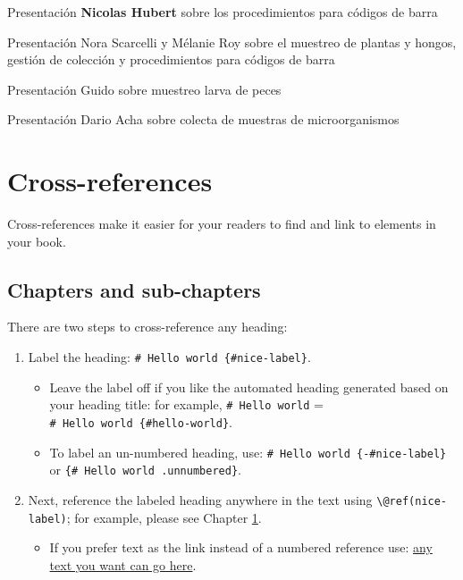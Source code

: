 \documentclass[
]{book}
\providecommand{\tightlist}{%
  \setlength{\itemsep}{0pt}\setlength{\parskip}{0pt}}
\begin{document}
Presentación \textbf{Nicolas Hubert} sobre los procedimientos para códigos de barra

Presentación Nora Scarcelli y Mélanie Roy sobre el muestreo de plantas y
hongos, gestión de colección y procedimientos para códigos de barra

Presentación Guido sobre muestreo larva de peces

Presentación Dario Acha sobre colecta de muestras de microorganismos

\hypertarget{cross}{%
\chapter{Cross-references}\label{cross}}

Cross-references make it easier for your readers to find and link to elements in your book.

\hypertarget{chapters-and-sub-chapters}{%
\section{Chapters and sub-chapters}\label{chapters-and-sub-chapters}}

There are two steps to cross-reference any heading:

\begin{enumerate}
\def\labelenumi{\arabic{enumi}.}
\tightlist
\item
  Label the heading: \texttt{\#\ Hello\ world\ \{\#nice-label\}}.

  \begin{itemize}
  \tightlist
  \item
    Leave the label off if you like the automated heading generated based on your heading title: for example, \texttt{\#\ Hello\ world} = \texttt{\#\ Hello\ world\ \{\#hello-world\}}.
  \item
    To label an un-numbered heading, use: \texttt{\#\ Hello\ world\ \{-\#nice-label\}} or \texttt{\{\#\ Hello\ world\ .unnumbered\}}.
  \end{itemize}
\item
  Next, reference the labeled heading anywhere in the text using \texttt{\textbackslash{}@ref(nice-label)}; for example, please see Chapter \ref{cross}.

  \begin{itemize}
  \tightlist
  \item
    If you prefer text as the link instead of a numbered reference use: \protect\hyperlink{cross}{any text you want can go here}.
  \end{itemize}
\end{enumerate}
\end{document}
